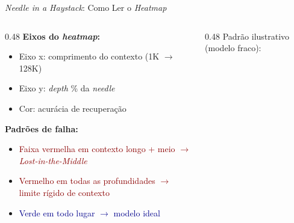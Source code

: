 \documentclass[aspectratio=169, xcolor=dvipsnames]{beamer}
\begin{document}
  \begin{frame}{\textit{Needle in a Haystack}: Como Ler o \textit{Heatmap}}
    \begin{columns}
      \begin{column}{0.48\textwidth}
        \textbf{Eixos do \textit{heatmap}:}
        \begin{itemize}
          \item Eixo x: comprimento do contexto (1K $\to$ 128K)
          \item Eixo y: \textit{depth} \% da \textit{needle}
          \item Cor: acurácia de recuperação
        \end{itemize}

        \vspace{0.3em}
        \textbf{Padrões de falha:}
        \begin{itemize}
          \item \textcolor{DarkRed}{Faixa vermelha em contexto longo + meio $\to$ \textit{Lost-in-the-Middle}}
          \item \textcolor{DarkRed}{Vermelho em todas as profundidades $\to$ limite rígido de contexto}
          \item \textcolor{DarkBlue}{Verde em todo lugar $\to$ modelo ideal}
        \end{itemize}
      \end{column}
      \begin{column}{0.48\textwidth}
        {\scriptsize Padrão ilustrativo (modelo fraco):}

        \vspace{0.2em}
      \end{column}
    \end{columns}
  \end{frame}
\end{document}
